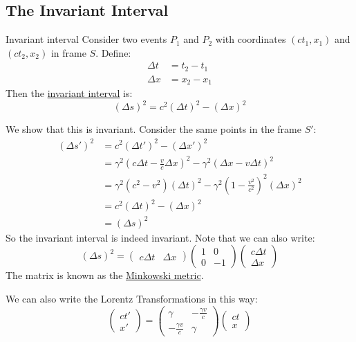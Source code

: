 \documentclass[../Main.tex]{subfiles}
\begin{document}
\subsection{The Invariant Interval}
\begin{definition}{Invariant interval}
    Consider two events $P_1$ and $P_2$ with coordinates $(ct_1, x_1)$ and $(ct_2, x_2)$ in frame $S$. Define:
    \begin{align*}
        \Delta t &= t_2 - t_1 \\
        \Delta x &= x_2 - x_1
    \end{align*}
    Then the \underline{invariant interval} is:
    \begin{equation}
        (\Delta s)^2 = c^2(\Delta t)^2 - (\Delta x)^2
        \label{eqnInvariantInterval}
    \end{equation}
\end{definition}
We show that this is invariant. Consider the same points in the frame $S'$:
\begin{align*}
    (\Delta s')^2 &= c^2(\Delta t')^2 - (\Delta x')^2 \\
    &= \gamma^2\left(c\Delta t - \frac{v}{c} \Delta x\right)^2 - \gamma^2 \left(\Delta x - v \Delta t\right)^2 \\
    &= \gamma^2\left(c^2 - v^2\right)\left(\Delta t\right)^2 - \gamma^2 \left(1 - \frac{v^2}{c^2}\right)^2 \left(\Delta x\right)^2 \\
    &= c^2 (\Delta t)^2 - (\Delta x)^2 \\
    &= (\Delta s)^2
\end{align*}
So the invariant interval is indeed invariant. Note that we can also write:
\begin{equation}
    (\Delta s)^2 = \begin{pmatrix}c\Delta t & \Delta x\end{pmatrix} \begin{pmatrix}1 & 0 \\ 0 & -1\end{pmatrix} \begin{pmatrix} c\Delta t \\ \Delta x\end{pmatrix}
    \label{eqnMinkowskiMetric}
\end{equation}
The matrix is known as the \underline{Minkowski metric}.\par
We can also write the Lorentz Transformations in this way:
\begin{equation}
    \begin{pmatrix} ct' \\ x'\end{pmatrix} = \begin{pmatrix}\gamma & -\frac{\gamma v}{c} \\ -\frac{\gamma v}{c} & \gamma\end{pmatrix} \begin{pmatrix}ct \\ x\end{pmatrix}
    \label{eqnLorentzMatrices}
\end{equation}
\end{document}

